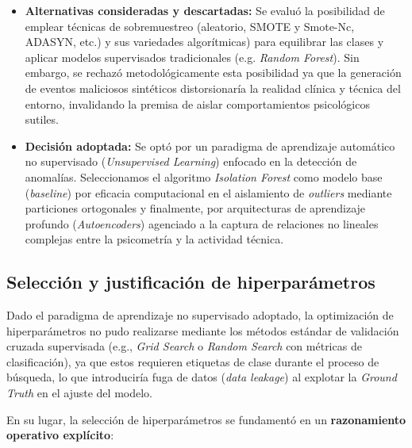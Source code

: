 \documentclass[IB]{TFUOC}%
\begin{document}
\begin{itemize}
    \item \textbf{Alternativas consideradas y descartadas:}
    Se evaluó la posibilidad de emplear técnicas de sobremuestreo (aleatorio, SMOTE y Smote-Nc, ADASYN, etc.) y sus variedades algorítmicas) para equilibrar las clases y aplicar modelos supervisados tradicionales (e.g. \textit{Random Forest}). Sin embargo, se rechazó metodológicamente esta posibilidad ya que la generación de eventos maliciosos sintéticos distorsionaría la realidad clínica y técnica del entorno, invalidando la premisa de aislar comportamientos psicológicos sutiles.
    \item \textbf{Decisión adoptada:}
    Se optó por un paradigma de aprendizaje automático no supervisado (\textit{Unsupervised Learning}) enfocado en la detección de anomalías. Seleccionamos el algoritmo \textit{Isolation Forest} como modelo base (\textit{baseline}) por eficacia computacional en el aislamiento de \textit{outliers} mediante particiones ortogonales y finalmente, por arquitecturas de aprendizaje profundo (\textit{Autoencoders}) agenciado a la captura de relaciones no lineales complejas entre la psicometría y la actividad técnica.    
\end{itemize}

\subsection{Selección y justificación de hiperparámetros}

Dado el paradigma de aprendizaje no supervisado adoptado, la optimización de hiperparámetros no pudo realizarse mediante los métodos estándar de validación cruzada supervisada (e.g., \textit{Grid Search} o \textit{Random Search} con métricas de clasificación), ya que estos requieren etiquetas de clase durante el proceso de búsqueda, lo que introduciría fuga de datos (\textit{data leakage}) al explotar la \textit{Ground Truth} en el ajuste del modelo.

\medskip
\noindent En su lugar, la selección de hiperparámetros se fundamentó en un \textbf{razonamiento operativo explícito}:
\end{document}
